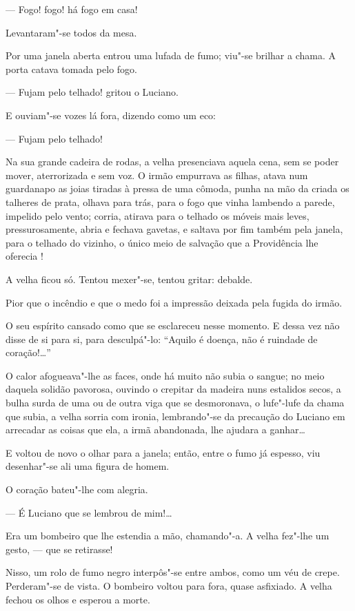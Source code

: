 --- Fogo! fogo! há fogo em casa!

Levantaram"-se todos da mesa.

Por uma janela aberta entrou uma lufada de fumo; viu"-se brilhar a chama.
A porta catava tomada pelo fogo.

--- Fujam pelo telhado! gritou o Luciano.

E ouviam"-se vozes lá fora, dizendo como um eco:

--- Fujam pelo telhado!

Na sua grande cadeira de rodas, a velha presenciava aquela cena, sem se
poder mover, aterrorizada e sem voz. O irmão empurrava as filhas, atava
num guardanapo as joias tiradas à pressa de uma cômoda, punha na mão da
criada os talheres de prata, olhava para trás, para o fogo que vinha
lambendo a parede, impelido pelo vento; corria, atirava para o telhado
os móveis mais leves, pressurosamente, abria e fechava gavetas, e
saltava por fim também pela janela, para o telhado do vizinho, o único
meio de salvação que a Providência lhe oferecia !

A velha ficou só. Tentou mexer"-se, tentou gritar: debalde.

Pior que o incêndio e que o medo foi a impressão deixada pela fugida do
irmão.

O seu espírito cansado como que se esclareceu nesse momento. E dessa vez
não disse de si para si, para desculpá"-lo: ``Aquilo é doença, não é
ruindade de coração!\ldots{}''

O calor afogueava"-lhe as faces, onde há muito não subia o sangue; no
meio daquela solidão pavorosa, ouvindo o crepitar da madeira nuns
estalidos secos, a bulha surda de uma ou de outra viga que se
desmoronava, o lufe"-lufe da chama que subia, a velha sorria com ironia,
lembrando"-se da precaução do Luciano em arrecadar as coisas que ela, a
irmã abandonada, lhe ajudara a ganhar\ldots{}

E voltou de novo o olhar para a janela; então, entre o fumo já espesso,
viu desenhar"-se ali uma figura de homem.

O coração bateu"-lhe com alegria.

--- É Luciano que se lembrou de mim!\ldots{}

Era um bombeiro que lhe estendia a mão, chamando"-a. A velha fez"-lhe um
gesto, --- que se retirasse!

Nisso, um rolo de fumo negro interpôs"-se entre ambos, como um véu de
crepe. Perderam"-se de vista. O bombeiro voltou para fora, quase
asfixiado. A velha fechou os olhos e esperou a morte.

